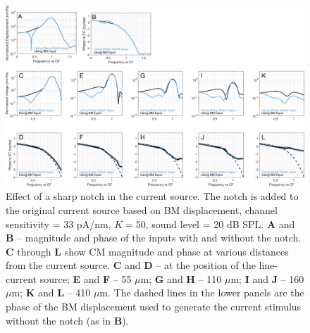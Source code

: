\documentclass{article}
\begin{document}
\begin{figure}[h]
\centering
\includegraphics[width = \textwidth]{final_figures/sharpnotchcomp.pdf}
\caption{Effect of a sharp notch in the current source. The notch is added to the original current source based on BM displacement, channel sensitivity = 33 pA/nm, $K=50$,  sound level = 20 dB SPL.  \textbf{A} and \textbf{B} -- magnitude and phase of the inputs with and without the notch.  \textbf{C} through \textbf{L} show CM magnitude and phase at various distances from the current source.  \textbf{C} and \textbf{D} -- at the position of the line-current source; \textbf{E} and \textbf{F} -- 55 $\mu$m; \textbf{G} and \textbf{H} -- 110 $\mu$m; \textbf{I} and \textbf{J} -- 160 $\mu$m; \textbf{K} and \textbf{L} -- 410 $\mu$m. The dashed lines in the lower panels are the phase of the BM displacement used to generate the current stimulus without the notch (as in \textbf{B}).}
\label{notchsharp}
\end{figure}
\end{document}
